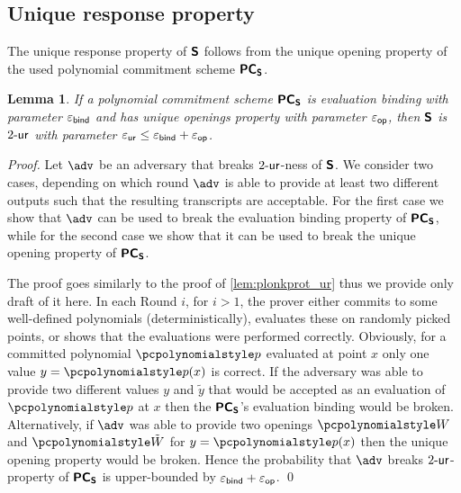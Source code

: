 \documentclass[runningheads,11pt]{llncs}
\newtheorem{lemma}[theorem]{Lemma} \newtheorem{corollary}[theorem]{Corollary}
\theoremstyle{definition} \newtheorem{definition}[theorem]{Definition}
\begin{document}
\subsection{Unique response property}
The unique response property of $\bm{\mathsf{S}}$ follows from the unique opening
property of the used polynomial commitment scheme $\bm{\mathsf{PC}}_{\bm{\mathsf{S}}}$.
\begin{lemma}
\label{lem:sonicprot_ur}
If a polynomial commitment scheme $\bm{\mathsf{PC}}_{\bm{\mathsf{S}}}$ is evaluation binding with
parameter $\varepsilon_{\mathsf{bind}}$ and has unique openings property with parameter
$\varepsilon_{\mathsf{op}}$, then $\bm{\mathsf{S}}$ is ${2\text{-}\mathsf{ur}}$ with parameter $\varepsilon_{\mathsf{ur}} \leq
\varepsilon_{\mathsf{bind}} + \varepsilon_{\mathsf{op}}$.  
\end{lemma}
\begin{proof}
  Let $\adv$ be an adversary that breaks ${2\text{-}\mathsf{ur}}$-ness of $\bm{\mathsf{S}}$.  We
  consider two cases, depending on which round $\adv$ is able to provide at
  least two different outputs such that the resulting transcripts are
  acceptable.  For the first case we show that $\adv$ can be used to break the
  evaluation binding property of $\bm{\mathsf{PC}}_{\bm{\mathsf{S}}}$, while for the second case we show
  that it can be used to break the unique opening property of $\bm{\mathsf{PC}}_{\bm{\mathsf{S}}}$.

  The proof goes similarly to the proof of \cref{lem:plonkprot_ur} thus we
  provide only draft of it here.  In each Round $i$, for $i > 1$, the prover
  either commits to some well-defined polynomials (deterministically), evaluates
  these on randomly picked points, or shows that the evaluations were performed
  correctly.  Obviously, for a committed polynomial $\p{p}$ evaluated at point
  $x$ only one value $y = \p{p}(x)$ is correct. If the adversary was able to
  provide two different values $y$ and $\tilde{y}$ that would be accepted as an
  evaluation of $\p{p}$ at $x$ then the $\bm{\mathsf{PC}}_{\bm{\mathsf{S}}}$'s evaluation binding would be
  broken.  Alternatively, if $\adv$ was able to provide two openings $\p{W}$ and
  $\p{\tilde{W}}$ for $y = \p{p}(x)$ then the unique opening property would be
  broken.
%
Hence the probability that $\adv$ breaks ${2\text{-}\mathsf{ur}}$-property of $\bm{\mathsf{PC}}_{\bm{\mathsf{S}}}$ is
upper-bounded by $\varepsilon_{\mathsf{bind}} + \varepsilon_{\mathsf{op}}$. 
\qed

\end{proof}
\end{document}
